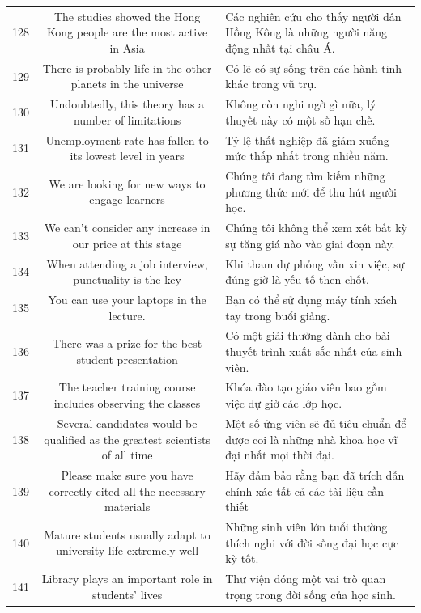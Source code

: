 \documentclass[11pt,a4paper]{article}
\begin{document}
\begin{longtable}{N S M}
128 & The studies showed the Hong Kong people are the most active in Asia & Các nghiên cứu cho thấy người dân Hồng Kông là những người năng động nhất tại châu Á. \\
129 & There is probably life in the other planets in the universe & Có lẽ có sự sống trên các hành tinh khác trong vũ trụ. \\
130 & Undoubtedly, this theory has a number of limitations & Không còn nghi ngờ gì nữa, lý thuyết này có một số hạn chế. \\
131 & Unemployment rate has fallen to its lowest level in years & Tỷ lệ thất nghiệp đã giảm xuống mức thấp nhất trong nhiều năm. \\
132 & We are looking for new ways to engage learners & Chúng tôi đang tìm kiếm những phương thức mới để thu hút người học. \\
133 & We can’t consider any increase in our price at this stage & Chúng tôi không thể xem xét bất kỳ sự tăng giá nào vào giai đoạn này. \\
134 & When attending a job interview, punctuality is the key & Khi tham dự phỏng vấn xin việc, sự đúng giờ là yếu tố then chốt. \\
135 & You can use your laptops in the lecture. & Bạn có thể sử dụng máy tính xách tay trong buổi giảng. \\
136 & There was a prize for the best student presentation & Có một giải thưởng dành cho bài thuyết trình xuất sắc nhất của sinh viên. \\
137 & The teacher training course includes observing the classes & Khóa đào tạo giáo viên bao gồm việc dự giờ các lớp học. \\
138 & Several candidates would be qualified as the greatest scientists of all time & Một số ứng viên sẽ đủ tiêu chuẩn để được coi là những nhà khoa học vĩ đại nhất mọi thời đại. \\
139 & Please make sure you have correctly cited all the necessary materials & Hãy đảm bảo rằng bạn đã trích dẫn chính xác tất cả các tài liệu cần thiết \\
140 & Mature students usually adapt to university life extremely well & Những sinh viên lớn tuổi thường thích nghi với đời sống đại học cực kỳ tốt. \\
141 & Library plays an important role in students' lives & Thư viện đóng một vai trò quan trọng trong đời sống của học sinh. \\

\end{longtable}
\end{document}
